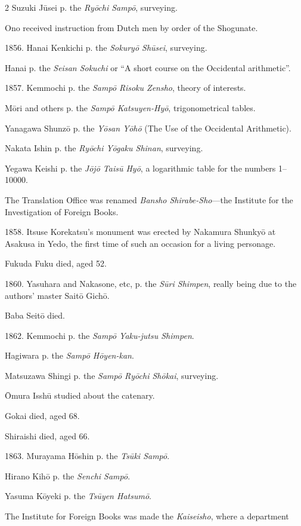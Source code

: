 \documentclass[11pt]{article}
\newcommand{\scanfooter}{}
\begin{document}
\begin{multicols}{2}
\columnbreak
Suzuki Jūsei p. the \emph{Ryōchi Sampō}, surveying.

Ono received instruction from Dutch men by order of the Shogunate.

1856. Hanai Kenkichi p. the \emph{Sokuryō Shūsei}, surveying.

Hanai p. the \emph{Seisan Sokuchi} or ``A short course on the Occidental arithmetic''.

1857. Kemmochi p. the \emph{Sampō Risoku Zensho}, theory of interests.

Mōri and others p. the \emph{Sampō Katsuyen-Hyō}, trigonometrical tables.

Yanagawa Shunzō p. the \emph{Yōsan Yōhō} (The Use of the Occidental Arithmetic).

Nakata Ishin p. the \emph{Ryōchi Yōgaku Shinan}, surveying.

Yegawa Keishi p. the \emph{Jōjō Taisū Hyō}, a logarithmic table for the numbers 1--10000.

The Translation Office was renamed \emph{Bansho Shirabe-Sho}---the Institute for the Investigation of Foreign Books.

1858. Itsuse Korekatsu's monument was erected by Nakamura Shunkyō at Asakusa in Yedo, the first time of such an occasion for a living personage.

Fukuda Fuku died, aged 52.

1860. Yasuhara and Nakasone, etc, p. the \emph{Sūri Shimpen}, really being due to the authors' master Saitō Gichō.

Baba Seitō died.

1862. Kemmochi p. the \emph{Sampō Yaku-jutsu Shimpen}.

Hagiwara p. the \emph{Sampō Hōyen-kan}.

Matsuzawa Shingi p. the \emph{Sampō Ryōchi Shōkai}, surveying.

Ōmura Isshū studied about the catenary.

Gokai died, aged 68.

Shiraishi died, aged 66.

1863. Murayama Hōshin p. the \emph{Tsūki Sampō}.

Hirano Kihō p. the \emph{Senchi Sampō}.

Yasuma Kōyeki p. the \emph{Tsūyen Hatsumō}.

The Institute for Foreign Books was made the \emph{Kaiseisho}, where a department
\end{multicols}
\scanfooter
\end{document}
